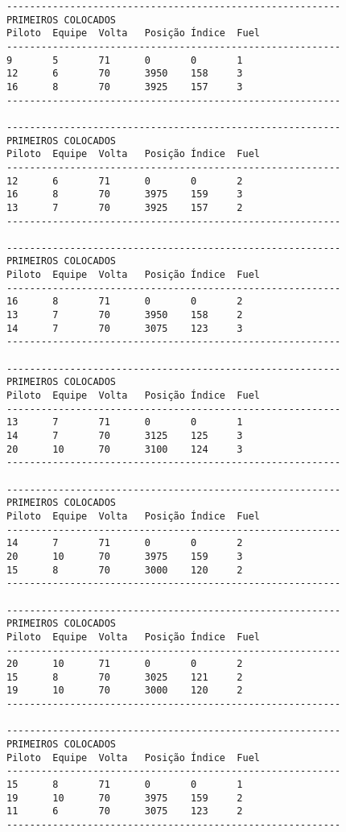\documentclass[12pt]{article}
\begin{document}
\begin{verbatim}
----------------------------------------------------------
PRIMEIROS COLOCADOS
Piloto  Equipe  Volta   Posição Índice  Fuel
----------------------------------------------------------
9       5       71      0       0       1
12      6       70      3950    158     3
16      8       70      3925    157     3
----------------------------------------------------------

----------------------------------------------------------
PRIMEIROS COLOCADOS
Piloto  Equipe  Volta   Posição Índice  Fuel
----------------------------------------------------------
12      6       71      0       0       2
16      8       70      3975    159     3
13      7       70      3925    157     2
----------------------------------------------------------

----------------------------------------------------------
PRIMEIROS COLOCADOS
Piloto  Equipe  Volta   Posição Índice  Fuel
----------------------------------------------------------
16      8       71      0       0       2
13      7       70      3950    158     2
14      7       70      3075    123     3
----------------------------------------------------------

----------------------------------------------------------
PRIMEIROS COLOCADOS
Piloto  Equipe  Volta   Posição Índice  Fuel
----------------------------------------------------------
13      7       71      0       0       1
14      7       70      3125    125     3
20      10      70      3100    124     3
----------------------------------------------------------

----------------------------------------------------------
PRIMEIROS COLOCADOS
Piloto  Equipe  Volta   Posição Índice  Fuel
----------------------------------------------------------
14      7       71      0       0       2
20      10      70      3975    159     3
15      8       70      3000    120     2
----------------------------------------------------------

----------------------------------------------------------
PRIMEIROS COLOCADOS
Piloto  Equipe  Volta   Posição Índice  Fuel
----------------------------------------------------------
20      10      71      0       0       2
15      8       70      3025    121     2
19      10      70      3000    120     2
----------------------------------------------------------

----------------------------------------------------------
PRIMEIROS COLOCADOS
Piloto  Equipe  Volta   Posição Índice  Fuel
----------------------------------------------------------
15      8       71      0       0       1
19      10      70      3975    159     2
11      6       70      3075    123     2
----------------------------------------------------------


\end{verbatim}
\end{document}
